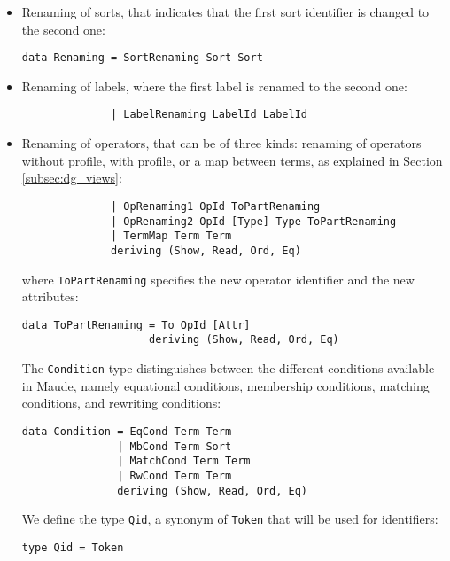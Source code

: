 \begin{itemize}

\item Renaming of sorts, that indicates that the first sort identifier
is changed to the second one:

{\codesize
\begin{verbatim}
data Renaming = SortRenaming Sort Sort
\end{verbatim}
}

\item Renaming of labels, where the first label is renamed to the
second one:

{\codesize
\begin{verbatim}
              | LabelRenaming LabelId LabelId
\end{verbatim}
}

\item Renaming of operators, that can be of three kinds: renaming
of operators without profile, with profile, or a map between terms,
as explained in Section \ref{subsec:dg_views}:

{\codesize
\begin{verbatim}
              | OpRenaming1 OpId ToPartRenaming
              | OpRenaming2 OpId [Type] Type ToPartRenaming
              | TermMap Term Term
              deriving (Show, Read, Ord, Eq)
\end{verbatim}
}

\noindent where \verb"ToPartRenaming" specifies the new operator identifier
and the new attributes:

{\codesize
\begin{verbatim}
data ToPartRenaming = To OpId [Attr]
                    deriving (Show, Read, Ord, Eq)
\end{verbatim}
}

The \verb"Condition" type distinguishes between the different conditions
available in Maude, namely equational conditions, membership conditions,
matching conditions, and rewriting conditions:

{\codesize
\begin{verbatim}
data Condition = EqCond Term Term
               | MbCond Term Sort
               | MatchCond Term Term
               | RwCond Term Term
               deriving (Show, Read, Ord, Eq)
\end{verbatim}
}

We define the type \verb"Qid", a synonym of \verb"Token" that
will be used for identifiers:

{\codesize
\begin{verbatim}
type Qid = Token
\end{verbatim}
}


\end{itemize}
